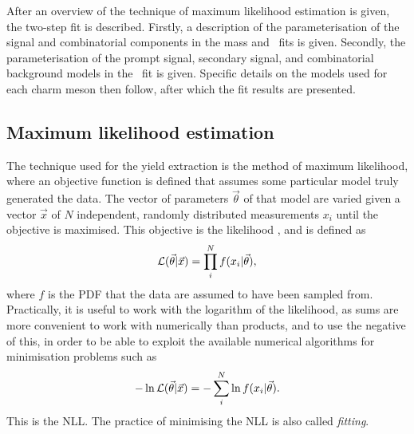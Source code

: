 After an overview of the technique of maximum likelihood estimation is given, 
the two-step fit is described.
Firstly, a description of the parameterisation of the signal and combinatorial 
components in the mass and \deltam\ fits is given.
Secondly, the parameterisation of the prompt signal, secondary signal, and 
combinatorial background models in the \lnipchisq\ fit is given.
Specific details on the models used for each charm meson then follow, after 
which the fit results are presented.

\subsection{Maximum likelihood estimation}
\label{chap:prod:fitting:mle}

The technique used for the yield extraction is the method of maximum 
likelihood, where an objective function is defined that assumes some particular 
model truly generated the data.
The vector of parameters $\vec{\theta}$ of that model are varied given a vector 
$\vec{x}$ of $N$ independent, randomly distributed measurements $x_{i}$ until 
the objective is maximised.
This objective is the likelihood \likelihood, and is defined as
\begin{equation}
  \mathcal{L}(\vec{\theta}|\vec{x}) = \prod_{i}^{N} f(x_{i}|\vec{\theta}),
\end{equation}
where $f$ is the \ac{PDF} that the data are assumed to have been sampled 
from.\footnotemark
Practically, it is useful to work with the logarithm of the likelihood, as sums 
are more convenient to work with numerically than products, and to use the 
negative of this, in order to be able to exploit the available numerical 
algorithms for minimisation problems such as \minuit~\cite{James:1975dr}
\begin{equation}
  -\ln{\ensuremath{\mathcal{L}}(\vec{\theta}|\vec{x})} =
  -\sum_{i}^{N} \ln{f(x_{i}|\vec{\theta})}.
\end{equation}
This is the \acf{NLL}.
The practice of minimising the \ac{NLL} is also called \emph{fitting}.


